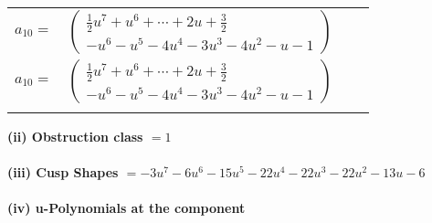 \documentclass[1p]{elsarticle_modified}
\theoremstyle{definition}
\begin{document}
\begin{tabular}{m{7pt} m{180pt} m{7pt} m{180pt} }
\flushright $a_{10}=$&$\begin{pmatrix}\frac{1}{2} u^7+u^6+\cdots+2 u+\frac{3}{2}\\- u^6- u^5-4 u^4-3 u^3-4 u^2- u-1\end{pmatrix}$\\ \flushright $a_{10}=$&$\begin{pmatrix}\frac{1}{2} u^7+u^6+\cdots+2 u+\frac{3}{2}\\- u^6- u^5-4 u^4-3 u^3-4 u^2- u-1\end{pmatrix}$\\&\end{tabular}
\flushleft \textbf{(ii) Obstruction class $= 1$}\\~\\
\flushleft \textbf{(iii) Cusp Shapes $= -3 u^7-6 u^6-15 u^5-22 u^4-22 u^3-22 u^2-13 u-6$}\\~\\
\newpage\renewcommand{\arraystretch}{1}
\flushleft \textbf{(iv) u-Polynomials at the component}\newline \\
\end{document}
